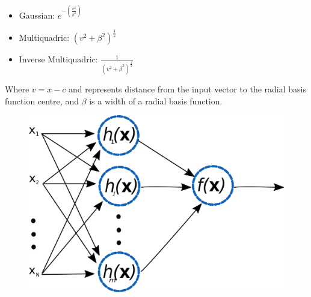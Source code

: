 \begin{itemize}
  \item Gaussian: $e^{-(\frac{v^2}{\beta^2})}$ 
  \item Multiquadric:  $(v^2+\beta^2)^{\frac{1}{2}}$
  \item Inverse Multiquadric:  $\frac{1}{(v^2+\beta^2)^{\frac{1}{2}}}$
  \end{itemize}
Where $v=x-c$ and represents distance from the input vector to the radial basis function centre, and $\beta$ is a width of a radial basis function.
\begin{figure}[h!]
\centering
\includegraphics[width=1\textwidth]{figures/chap3/rbf.png}
\caption{}
\label{figure:rbf}
\end{figure}